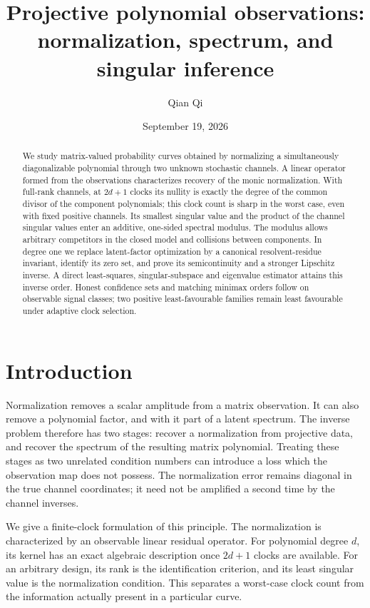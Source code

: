 \documentclass[11pt,reqno]{amsart}
\title[Projective polynomial observations]{Projective polynomial observations:\\ normalization, spectrum, and singular inference}
\author{Qian Qi}
\date{September 19, 2026}
\numberwithin{equation}{section}
\theoremstyle{definition}\newtheorem{definition}[theorem]{Definition}
\theoremstyle{remark}\newtheorem{remark}[theorem]{Remark}
\begin{document}
\begin{abstract}
We study matrix-valued probability curves obtained by normalizing a
simultaneously diagonalizable polynomial through two unknown stochastic
channels. A linear operator formed from the observations characterizes
recovery of the monic normalization. With full-rank channels, at
$2d+1$ clocks its nullity is exactly the degree of the common divisor of the component polynomials;
this clock count is sharp in the worst case, even with fixed positive
channels. Its smallest singular value and the product of the channel
singular values enter an additive, one-sided spectral modulus. The
modulus allows arbitrary competitors in the closed model and collisions
between components. In degree one we replace latent-factor optimization
by a canonical resolvent-residue invariant, identify its zero set, and
prove its semicontinuity and a stronger Lipschitz inverse. A direct
least-squares, singular-subspace and eigenvalue estimator attains this
inverse order. Honest confidence sets and matching minimax orders follow
on observable signal classes; two positive least-favourable families
remain least favourable under adaptive clock selection.
\end{abstract}
\maketitle

\section{Introduction}
Normalization removes a scalar amplitude from a matrix observation. It
can also remove a polynomial factor, and with it part of a latent
spectrum. The inverse problem therefore has two stages: recover a
normalization from projective data, and recover the spectrum of the
resulting matrix polynomial. Treating these stages as two unrelated
condition numbers can introduce a loss which the observation map does
not possess. The normalization error remains diagonal in the true
channel coordinates; it need not be amplified a second time by the
channel inverses.

We give a finite-clock formulation of this principle. The normalization
is characterized by an observable linear residual operator. For
polynomial degree $d$, its kernel has an exact algebraic description
once $2d+1$ clocks are available. For an arbitrary design, its rank is
the identification criterion, and its least singular value is the
normalization condition. This separates a worst-case clock count from
the information actually present in a particular curve.
\end{document}
